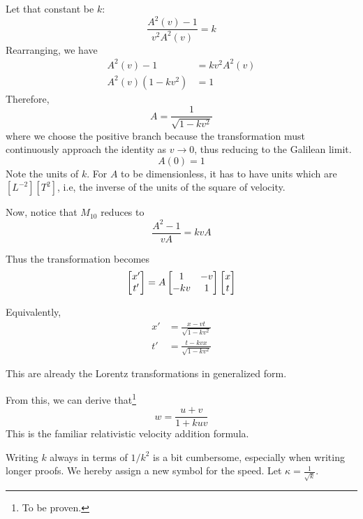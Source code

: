 		Let that constant be $k$:
		\begin{equation}
		    \frac{A^2(v) -1}{v^2A^2(v)} = k
		\end{equation}
		Rearranging, we have
		\begin{align*}
			A^2(v) - 1 & = kv^2A^2(v)\\
			A^2(v)(1-kv^2) & = 1
		\end{align*}
		Therefore,
		\begin{equation}
			A = \frac{1}{\sqrt{1 - kv^2}} 
		\end{equation}
		where we choose the positive branch because the transformation must 
		continuously approach the identity as $v\to 0$, thus reducing to the Galilean limit.
		\begin{equation}
		    A(0) = 1
		\end{equation}
		Note the units of $k$. For $A$ to be dimensionless, it has to have units which are $[L^{-2}][T^2]$, i.e, the inverse 
		of the units of the square of velocity.

		Now, notice that $M_{10}$ reduces to
		\begin{equation}
		    \frac{A^2 - 1}{vA} = kvA 
		\end{equation}
		
		Thus the transformation becomes
		\begin{equation}
			\bmqty{
				x'\\t'
			}=
		    A 
			\bmqty{
				1 & -v \\
				-kv & 1
			}
			\bmqty{
				x\\t
			}
		\end{equation}

		Equivalently,
		\begin{align}
			x'
			&=
			\frac{x-vt}{\sqrt{1-kv^2}}
			\\[4pt]
			t'
			&=
			\frac{t-kvx}{\sqrt{1-kv^2}}
		\end{align}

		This are already the Lorentz transformations in generalized form.

		From this, we can derive that\footnote{To be proven.}
		\begin{equation}
			w = \frac{u+v}{1 + kuv} 
		\end{equation}
		This is the familiar relativistic velocity addition formula. 

		Writing $k$ always in terms of $1/k^2$ is a bit cumbersome, especially when writing longer proofs.
		We hereby assign a new symbol for the speed.
		Let $\kappa = \frac{1}{\sqrt{k}}$.

